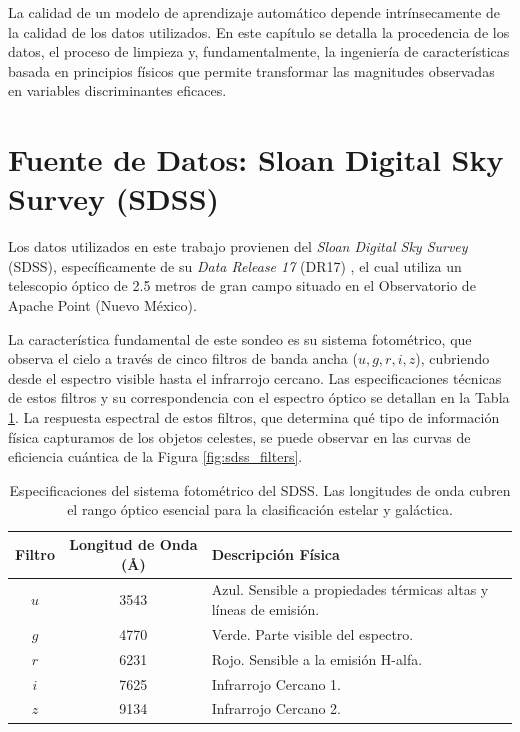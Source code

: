 \documentclass[12pt, a4paper]{report}
\begin{document}
La calidad de un modelo de aprendizaje automático depende intrínsecamente de la calidad de los datos utilizados. En este capítulo se detalla la procedencia de los datos, el proceso de limpieza y, fundamentalmente, la ingeniería de características basada en principios físicos que permite transformar las magnitudes observadas en variables discriminantes eficaces.

\section{Fuente de Datos: Sloan Digital Sky Survey (SDSS)}

Los datos utilizados en este trabajo provienen del \textit{Sloan Digital Sky Survey} (SDSS), específicamente de su \textit{Data Release 17} (DR17) \citep{Abdurrouf2022}, el cual utiliza un telescopio óptico de 2.5 metros de gran campo situado en el Observatorio de Apache Point (Nuevo México).

La característica fundamental de este sondeo es su sistema fotométrico, que observa el cielo a través de cinco filtros de banda ancha ($u, g, r, i, z$), cubriendo desde el espectro visible hasta el infrarrojo cercano. Las especificaciones técnicas de estos filtros y su correspondencia con el espectro óptico se detallan en la Tabla \ref{tab:filtros_sdss}. La respuesta espectral de estos filtros, que determina qué tipo de información física capturamos de los objetos celestes, se puede observar en las curvas de eficiencia cuántica de la Figura \ref{fig:sdss_filters}.

\begin{table}[hbt!]
\centering
\small 
\begin{tabular}{|c|c|p{8.5cm}|}
\hline
\textbf{Filtro} & \textbf{Longitud de Onda (\AA)} & \textbf{Descripción Física} \\ \hline
$u$ & 3543 & Azul. Sensible a propiedades térmicas altas y líneas de emisión. \\ \hline
$g$ & 4770 & Verde. Parte visible del espectro. \\ \hline
$r$ & 6231 & Rojo. Sensible a la emisión H-alfa. \\ \hline
$i$ & 7625 & Infrarrojo Cercano 1. \\ \hline
$z$ & 9134 & Infrarrojo Cercano 2. \\ \hline
\end{tabular}
\caption{Especificaciones del sistema fotométrico del SDSS. Las longitudes de onda cubren el rango óptico esencial para la clasificación estelar y galáctica.}
\label{tab:filtros_sdss}
\end{table}
\end{document}
